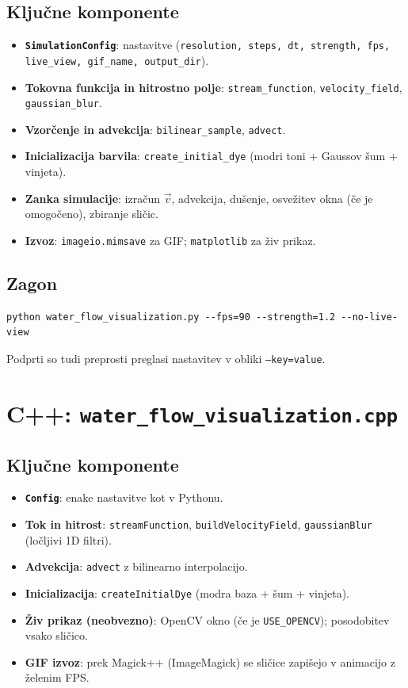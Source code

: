 \documentclass[11pt,a4paper]{article}
\begin{document}
\subsection*{Ključne komponente}
\begin{itemize}[noitemsep]
  \item \textbf{\texttt{SimulationConfig}}: nastavitve (\texttt{resolution, steps, dt, strength, fps, live\_view, gif\_name, output\_dir}).
  \item \textbf{Tokovna funkcija in hitrostno polje}: \texttt{stream\_function}, \texttt{velocity\_field}, \texttt{gaussian\_blur}.
  \item \textbf{Vzorčenje in advekcija}: \texttt{bilinear\_sample}, \texttt{advect}.
  \item \textbf{Inicializacija barvila}: \texttt{create\_initial\_dye} (modri toni + Gaussov šum + vinjeta).
  \item \textbf{Zanka simulacije}: izračun \(\vec v\), advekcija, dušenje, osvežitev okna (če je omogočeno), zbiranje sličic.
  \item \textbf{Izvoz}: \texttt{imageio.mimsave} za GIF; \texttt{matplotlib} za živ prikaz.
\end{itemize}

\subsection*{Zagon}
\begin{verbatim}
python water_flow_visualization.py --fps=90 --strength=1.2 --no-live-view
\end{verbatim}
Podprti so tudi preprosti preglasi nastavitev v obliki \texttt{--key=value}.

\section{C++: \texttt{water\_flow\_visualization.cpp}}
\subsection*{Ključne komponente}
\begin{itemize}[noitemsep]
  \item \textbf{\texttt{Config}}: enake nastavitve kot v Pythonu.
  \item \textbf{Tok in hitrost}: \texttt{streamFunction}, \texttt{buildVelocityField}, \texttt{gaussianBlur} (ločljivi 1D filtri).
  \item \textbf{Advekcija}: \texttt{advect} z bilinearno interpolacijo.
  \item \textbf{Inicializacija}: \texttt{createInitialDye} (modra baza + šum + vinjeta).
  \item \textbf{Živ prikaz (neobvezno)}: OpenCV okno (če je \texttt{USE\_OPENCV}); posodobitev vsako sličico.
  \item \textbf{GIF izvoz}: prek Magick++ (ImageMagick) se sličice zapišejo v animacijo z želenim FPS.
\end{itemize}
\end{document}

